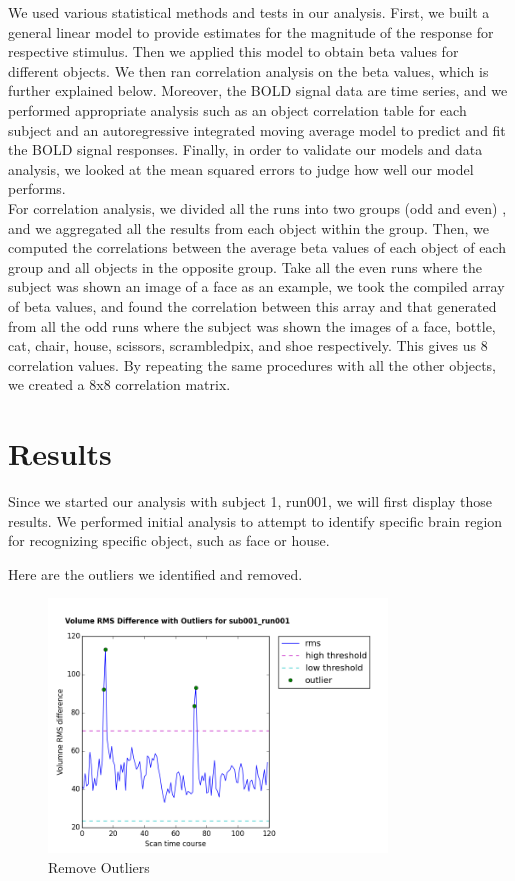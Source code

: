 \documentclass[11pt,twocolumn]{article}
\begin{document}
We used various statistical methods and tests in our analysis. First,
we built a general linear model to provide estimates for the magnitude of
the response for respective stimulus. Then we applied this model to obtain
beta values for different objects. We then ran correlation analysis on the
beta values, which is further explained below. Moreover, the BOLD signal 
data are time series, and we performed appropriate analysis such as 
an object correlation table for each subject and an autoregressive integrated
moving average model to predict and fit the BOLD signal responses. 
Finally, in order to validate our models and data analysis, we looked 
at the mean squared errors to judge how well our model performs. \\

For correlation analysis, we divided all the runs into two groups (odd and even)
, and we aggregated all the results from each object within the group. Then, 
we computed the correlations between the average beta values of each object 
of each group and all objects in the opposite group. Take all the even runs 
where the subject was shown an image of a face as an example, we took 
the compiled array of beta values, and found the correlation between this 
array and that generated from all the odd runs where the subject was shown 
the images of a face, bottle, cat, chair, house, scissors, scrambledpix, and 
shoe respectively. This gives us 8 correlation values. By repeating the same 
procedures with all the other objects, we created a 8x8 correlation matrix. \\

\section{Results}

Since we started our analysis with subject 1, run001, we will first display 
those results. We performed initial analysis to attempt to identify specific 
brain region for recognizing specific object, such as face or house. 

Here are the outliers we identified and removed. \\
\begin{figure}[h!]
\centering
\includegraphics[width=90mm]{Volume_RMS_Difference_Outliers_sub001_run001.png}
\caption{Remove Outliers}
\end{figure}
\end{document}
